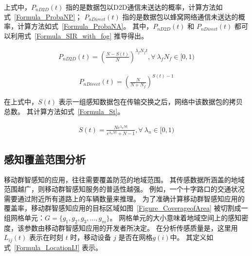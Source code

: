 上式中，$P_{nD2D}(t)$ 指的是数据包以D2D通信未送达的概率，计算方法如式~\eqref{Formula_ProbaNP}；
$P_{nDirect}(t)$ 指的是数据包以蜂窝网络通信未送达的概率，计算方法如式~\eqref{Formula_ProbaNA}。
其中，$P_{nD2D}(t)$ 和 $P_{nDirect}(t)$ 都可以利用式~\eqref{Formula_SIR_with_fog} 推导得出。


\begin{equation}
  \label{Formula_ProbaNP}
  \begin{aligned}
  P_{nD2D}(t) = (\frac{N-S(t)}{N})^{\lambda_f N_f t}, \forall \ \lambda_f N_f \in [0,1)
  \end{aligned}
\end{equation}

\begin{equation}
  \label{Formula_ProbaNA}
  \begin{aligned}
  P_{nDirect}(t) = (\frac{N}{N + N_f})^{S(t)-1}
  \end{aligned}
\end{equation}

在上式中，$S(t)$ 表示一组感知数据包在传输交换之后，网络中该数据包的拷贝总数。
其计算方法如式~\eqref{Formula_St}。

\begin{equation}
\label{Formula_St}
  \begin{aligned}
    S(t) = \frac{N e^{\lambda_n N t}}{e^{\lambda_n N t} + N -1}, \forall \ \lambda_n \in [0,1)
  \end{aligned}
\end{equation}

\subsection{感知覆盖范围分析}

移动群智感知的应用，往往需要覆盖防范的地域范围。
其传感数据所涵盖的地域范围越广，则移动群智感知服务的普适性越强。
例如，一个十字路口的交通状况需要通过附近所有道路上的车辆数量来推理。
为了准确计算移动群智感知应用的覆盖率，移动群智感知应用的目标区域如图~\ref{Figure_CoverageofArea} 被切割成一组网格单元：$G = \{g_1,g_2,g_3,\ldots,g_m\}$。
网格单元的大小意味着地域空间上的感知密度，该参数由移动群智感知应用的开发者所决定。
在分析传感质量是，这里用 $L_{ij}(t)$ 表示在时刻 $t$ 时，移动设备 $j$ 是否在网格$g(i)$中。
其定义如式~\eqref{Formula_LocationIJ} 表示。

